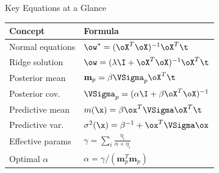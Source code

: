 \begin{frame}{Key Equations at a Glance}
  \begin{center}
  \renewcommand{\arraystretch}{1.6}
  \begin{tabular}{ll}
  \toprule
  \textbf{Concept} & \textbf{Formula}\\
  \midrule
  Normal equations & $\ow^* = (\oX^T\oX)^{-1}\oX^T\t$\\
  Ridge solution & $\ow = (\lambda\I+\oX^T\oX)^{-1}\oX^T\t$\\
  Posterior mean & $\mathbf{m}_p = \beta\VSigma_p\oX^T\t$\\
  Posterior cov. & $\VSigma_p = (\alpha\I+\beta\oX^T\oX)^{-1}$\\
  Predictive mean & $m(\x)=\beta\ox^T\VSigma\oX^T\t$\\
  Predictive var. & $\sigma^2(\x)=\beta^{-1}+\ox^T\VSigma\ox$\\
  Effective params & $\gamma=\sum_i\tfrac{\eta_i}{\alpha+\eta_i}$\\
  Optimal $\alpha$ & $\alpha=\gamma/(\mathbf{m}_p^T\mathbf{m}_p)$\\
  \bottomrule
  \end{tabular}
  \end{center}
\end{frame}

%
